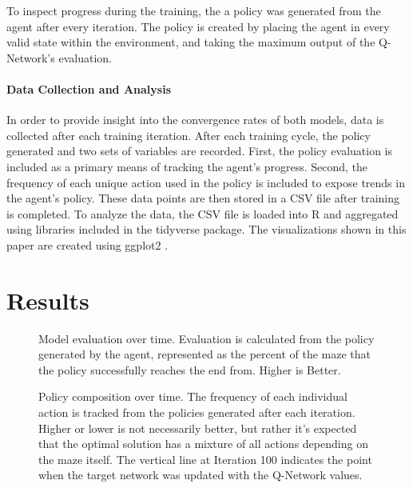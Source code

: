 \documentclass[12pt]{article}
\begin{document}
To inspect progress during the training, the a policy was generated from the agent after every iteration.
The policy is created by placing the agent in every valid state within the environment, and taking the maximum output of the Q-Network's evaluation.


\paragraph{Data Collection and Analysis}

In order to provide insight into the convergence rates of both models, data is collected after each training iteration.
After each training cycle, the policy generated and two sets of variables are recorded.
First, the policy evaluation is included as a primary means of tracking the agent's progress.
Second, the frequency of each unique action used in the policy is included to expose trends in the agent's policy.
These data points are then stored in a CSV file after training is completed.
To analyze the data, the CSV file is loaded into R \cite{lang_r} and aggregated using libraries included in the tidyverse \cite{lib_tidyverse} package.
The visualizations shown in this paper are created using ggplot2 \cite{lib_ggplot2}.

\section{Results}

\begin{figure}[h]
	\begin{center}
		
	\end{center}
	\caption{Model evaluation over time. Evaluation is calculated from the policy generated by the agent, represented as the percent of the maze that the policy successfully reaches the end from. Higher is Better.}
	\label{fig:evaluation}
\end{figure}

\begin{figure}[h]
	\begin{center}
		
	\end{center}
	\caption{Policy composition over time. The frequency of each individual action is tracked from the policies generated after each iteration. Higher or lower is not necessarily better, but rather it's expected that the optimal solution has a mixture of all actions depending on the maze itself. The vertical line at Iteration 100 indicates the point when the target network was updated with the Q-Network values.}
	\label{fig:directional}
\end{figure}
\end{document}
